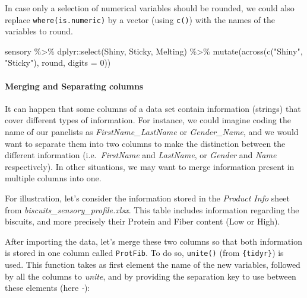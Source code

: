 \documentclass[
]{krantz}
\makeatletter
\newenvironment{Shaded}{\begin{snugshade}}{\end{snugshade}}
\newcommand{\AttributeTok}[1]{\textcolor[rgb]{0.61,0.61,0.61}{#1}}
\newcommand{\DecValTok}[1]{\textcolor[rgb]{0.06,0.06,0.06}{#1}}
\newcommand{\FunctionTok}[1]{\textcolor[rgb]{0,0,0}{#1}}
\newcommand{\NormalTok}[1]{#1}
\newcommand{\SpecialCharTok}[1]{\textcolor[rgb]{0,0,0}{#1}}
\newcommand{\StringTok}[1]{\textcolor[rgb]{0.5,0.5,0.5}{#1}}
\newenvironment{kframe}{%
\medskip{}
\setlength{\fboxsep}{.8em}
 \def\at@end@of@kframe{}%
 \ifinner\ifhmode%
  \def\at@end@of@kframe{\end{minipage}}%
  \begin{minipage}{\columnwidth}%
 \fi\fi%
 \def\FrameCommand##1{\hskip\@totalleftmargin \hskip-\fboxsep
 \colorbox{shadecolor}{##1}\hskip-\fboxsep
     \hskip-\linewidth \hskip-\@totalleftmargin \hskip\columnwidth}%
 \MakeFramed {\advance\hsize-\width
   \@totalleftmargin\z@ \linewidth\hsize
   \@setminipage}}%
 {\par\unskip\endMakeFramed%
 \at@end@of@kframe}
\renewenvironment{Shaded}{\begin{kframe}}{\end{kframe}}
\makeatother
\begin{document}
In case only a selection of numerical variables should be rounded, we could also replace \texttt{where(is.numeric)} by a vector (using \texttt{c()}) with the names of the variables to round.

\begin{Shaded}
\begin{Highlighting}[]
\NormalTok{sensory }\SpecialCharTok{\%\textgreater{}\%}
\NormalTok{  dplyr}\SpecialCharTok{::}\FunctionTok{select}\NormalTok{(Shiny, Sticky, Melting) }\SpecialCharTok{\%\textgreater{}\%}
  \FunctionTok{mutate}\NormalTok{(}\FunctionTok{across}\NormalTok{(}\FunctionTok{c}\NormalTok{(}\StringTok{"Shiny"}\NormalTok{, }\StringTok{"Sticky"}\NormalTok{), round, }\AttributeTok{digits =} \DecValTok{0}\NormalTok{))}
\end{Highlighting}
\end{Shaded}

\hypertarget{merging-and-separating-columns}{%
\paragraph*{Merging and Separating columns}\label{merging-and-separating-columns}}

It can happen that some columns of a data set contain information (strings) that cover different types of information. For instance, we could imagine coding the name of our panelists as \emph{FirstName\_LastName} or \emph{Gender\_Name}, and we would want to separate them into two columns to make the distinction between the different information (i.e.~\emph{FirstName} and \emph{LastName}, or \emph{Gender} and \emph{Name} respectively). In other situations, we may want to merge information present in multiple columns into one.

For illustration, let's consider the information stored in the \emph{Product Info} sheet from \emph{biscuits\_sensory\_profile.xlsx}. This table includes information regarding the biscuits, and more precisely their Protein and Fiber content (Low or High).

After importing the data, let's merge these two columns so that both information is stored in one column called \texttt{ProtFib}.
To do so, \texttt{unite()} (from \texttt{\{tidyr\}}) is used. This function takes as first element the name of the new variables, followed by all the columns to \emph{unite}, and by providing the separation key to use between these elements (here \emph{-}):
\end{document}
